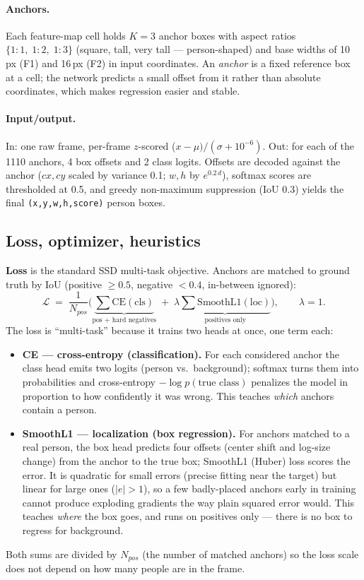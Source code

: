 \documentclass[11pt]{article}
\newcommand{\code}[1]{\texttt{\small #1}}
\begin{document}
\paragraph{Anchors.} Each feature-map cell holds $K{=}3$ anchor boxes with
aspect ratios $\{1{:}1,\;1{:}2,\;1{:}3\}$ (square, tall, very tall ---
person-shaped) and base widths of 10\,px (F1) and 16\,px (F2) in input
coordinates. An \emph{anchor} is a fixed reference box at a cell; the
network predicts a small offset from it rather than absolute coordinates,
which makes regression easier and stable.

\paragraph{Input/output.} In: one raw frame, per-frame $z$-scored
($x\!-\!\mu)/(\sigma\!+\!10^{-6})$. Out: for each of the 1110 anchors, 4 box
offsets and 2 class logits. Offsets are decoded against the anchor
($cx,cy$ scaled by variance 0.1; $w,h$ by $e^{0.2\,d}$), softmax scores are
thresholded at 0.5, and greedy non-maximum suppression (IoU $0.3$) yields
the final \code{(x,y,w,h,score)} person boxes.

\subsection{Loss, optimizer, heuristics}

\textbf{Loss} is the standard SSD multi-task objective. Anchors are matched
to ground truth by IoU (positive $\geq0.5$, negative $<0.4$, in-between
ignored):
\[
\mathcal{L} \;=\; \frac{1}{N_{pos}}\Big(
\underbrace{\textstyle\sum \mathrm{CE}(\text{cls})}_{\text{pos + hard negatives}}
\;+\; \lambda \underbrace{\textstyle\sum \mathrm{SmoothL1}(\text{loc})}_{\text{positives only}}
\Big), \qquad \lambda = 1.
\]
The loss is ``multi-task'' because it trains two heads at once, one term
each:

\begin{itemize}
\item \textbf{CE --- cross-entropy (classification).} For each considered
      anchor the class head emits two logits (person vs.\ background);
      softmax turns them into probabilities and cross-entropy
      $-\log p(\text{true class})$ penalizes the model in proportion to how
      confidently it was wrong. This teaches \emph{which} anchors contain a
      person.
\item \textbf{SmoothL1 --- localization (box regression).} For anchors
      matched to a real person, the box head predicts four offsets
      (center shift and log-size change) from the anchor to the true box;
      SmoothL1 (Huber) loss scores the error. It is quadratic for small
      errors (precise fitting near the target) but linear for large ones
      ($|e|>1$), so a few badly-placed anchors early in training cannot
      produce exploding gradients the way plain squared error would. This
      teaches \emph{where} the box goes, and runs on positives only ---
      there is no box to regress for background.
\end{itemize}
Both sums are divided by $N_{pos}$ (the number of matched anchors) so the
loss scale does not depend on how many people are in the frame.
\end{document}
